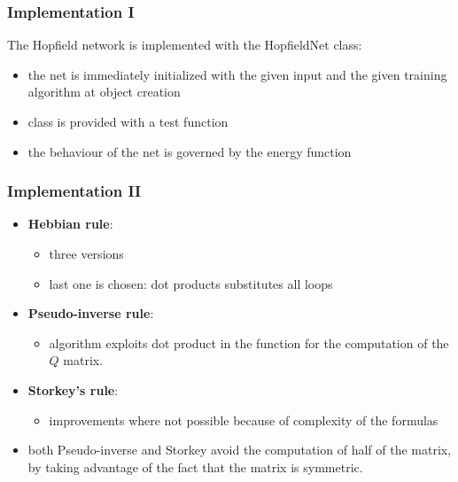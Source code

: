\documentclass{beamer}
\begin{document}
\begin{frame}
\frametitle{Implementation I}
The Hopfield network is implemented with the HopfieldNet class:
\begin{itemize}
\item the net is immediately initialized with the given input and the given training algorithm at object creation
\item class is provided with a test function
\item the behaviour of the net is governed by the energy function
\end{itemize}
\end{frame}


\begin{frame}
\frametitle{Implementation II}
\begin{itemize}
\item \textbf{Hebbian rule}:
\begin{itemize}
\item three versions
\item last one is chosen: dot products substitutes all loops
\end{itemize}
\item \textbf{Pseudo-inverse rule}:
\begin{itemize}
\item algorithm exploits dot product in the function for the computation of the $Q$ matrix.
\end{itemize}
\item \textbf{Storkey's rule}:
\begin{itemize}
\item improvements where not possible because of complexity of the formulas
\end{itemize}
\item both Pseudo-inverse and Storkey avoid the computation of half of the matrix, by taking advantage of the fact that the matrix is symmetric.
\end{itemize}
\end{frame}

%
\end{document}
